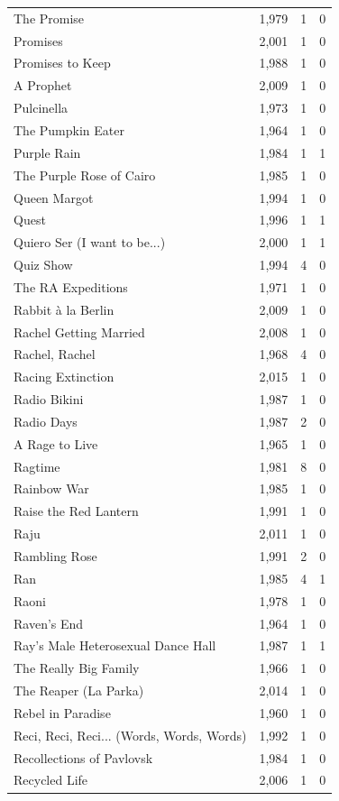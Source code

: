 \begin{tabular}{lrrr}
The Promise & 1,979 & 1 & 0 \\
Promises & 2,001 & 1 & 0 \\
Promises to Keep & 1,988 & 1 & 0 \\
A Prophet & 2,009 & 1 & 0 \\
Pulcinella & 1,973 & 1 & 0 \\
The Pumpkin Eater & 1,964 & 1 & 0 \\
Purple Rain & 1,984 & 1 & 1 \\
The Purple Rose of Cairo & 1,985 & 1 & 0 \\
Queen Margot & 1,994 & 1 & 0 \\
Quest & 1,996 & 1 & 1 \\
Quiero Ser (I want to be...) & 2,000 & 1 & 1 \\
Quiz Show & 1,994 & 4 & 0 \\
The RA Expeditions & 1,971 & 1 & 0 \\
Rabbit à la Berlin & 2,009 & 1 & 0 \\
Rachel Getting Married & 2,008 & 1 & 0 \\
Rachel, Rachel & 1,968 & 4 & 0 \\
Racing Extinction & 2,015 & 1 & 0 \\
Radio Bikini & 1,987 & 1 & 0 \\
Radio Days & 1,987 & 2 & 0 \\
A Rage to Live & 1,965 & 1 & 0 \\
Ragtime & 1,981 & 8 & 0 \\
Rainbow War & 1,985 & 1 & 0 \\
Raise the Red Lantern & 1,991 & 1 & 0 \\
Raju & 2,011 & 1 & 0 \\
Rambling Rose & 1,991 & 2 & 0 \\
Ran & 1,985 & 4 & 1 \\
Raoni & 1,978 & 1 & 0 \\
Raven's End & 1,964 & 1 & 0 \\
Ray's Male Heterosexual Dance Hall & 1,987 & 1 & 1 \\
The Really Big Family & 1,966 & 1 & 0 \\
The Reaper (La Parka) & 2,014 & 1 & 0 \\
Rebel in Paradise & 1,960 & 1 & 0 \\
Reci, Reci, Reci... (Words, Words, Words) & 1,992 & 1 & 0 \\
Recollections of Pavlovsk & 1,984 & 1 & 0 \\
Recycled Life & 2,006 & 1 & 0 \\

\end{tabular}
